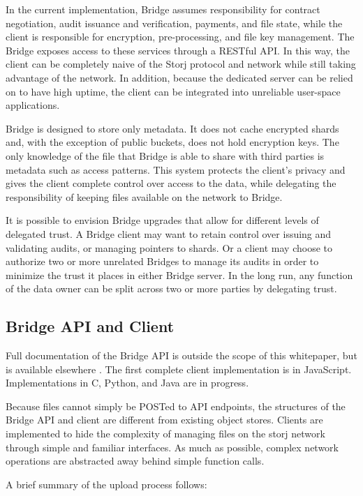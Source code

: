\documentclass[a4paper,10pt]{article}
\begin{document}
In the current implementation, Bridge assumes responsibility for contract negotiation, audit issuance and verification, payments, and file state, while the client is responsible for encryption, pre-processing, and file key management. The Bridge exposes access to these services through a RESTful API. In this way, the client can be completely naive of the Storj protocol and network while still taking advantage of the network. In addition, because the dedicated server can be relied on to have high uptime, the client can be integrated into unreliable user-space applications.

Bridge is designed to store only metadata. It does not cache encrypted shards and, with the exception of public buckets, does not hold encryption keys. The only knowledge of the file that Bridge is able to share with third parties is metadata such as access patterns. This system protects the client's privacy and gives the client complete control over access to the data, while delegating the responsibility of keeping files available on the network to Bridge.

It is possible to envision Bridge upgrades that allow for different levels of delegated trust. A Bridge client may want to retain control over issuing and validating audits, or managing pointers to shards. Or a client may choose to authorize two or more unrelated Bridges to manage its audits in order to minimize the trust it places in either Bridge server. In the long run, any function of the data owner can be split across two or more parties by delegating trust.

\subsection{Bridge API and Client}
Full documentation of the Bridge API is outside the scope of this whitepaper, but is available elsewhere \cite{16}. The first complete client implementation is in JavaScript. Implementations in C, Python, and Java are in progress.

Because files cannot simply be POSTed to API endpoints, the structures of the Bridge API and client are different from existing object stores. Clients are implemented to hide the complexity of managing files on the storj network through simple and familiar interfaces. As much as possible, complex network operations are abstracted away behind simple function calls.

A brief summary of the upload process follows:
\end{document}
